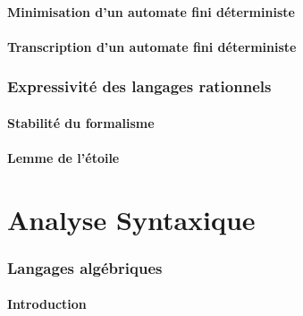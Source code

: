 \documentclass[9pt, handout]{beamer}
\begin{document}
\subsection{Minimisation d'un automate fini déterministe}








 
\subsection{Transcription d'un automate fini déterministe}



 
\section{Expressivité des langages rationnels}
 
\subsection{Stabilité du formalisme}



 
\subsection{Lemme de l'étoile}



 
 
\part{Analyse Syntaxique}
 
 
\section{Langages algébriques}
 
\subsection{Introduction}



 
\end{document}
